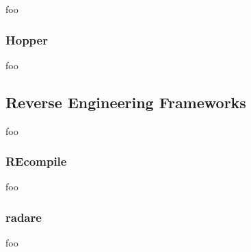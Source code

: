 
foo

\cite{retargetable_decomp}


\subsubsection{Hopper}


foo


\subsection{Reverse Engineering Frameworks}

foo


\subsubsection{REcompile}

foo

\cite{recompile}


\subsubsection{radare}

foo

\cite{radare}
